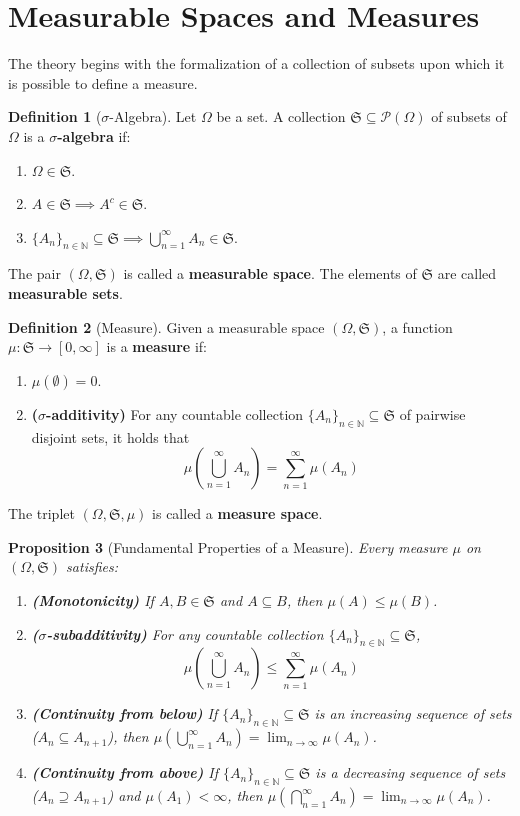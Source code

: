 \documentclass[12pt, openany]{book}
\theoremstyle{definition}
\newtheorem{definition}{Definition}[section]
\theoremstyle{plain}
\newtheorem{proposition}[definition]{Proposition}
\theoremstyle{remark}
\newcommand{\N}{\mathbb{N}}
\newcommand{\germS}{\mathfrak{S}} %
\begin{document}
\section*{Measurable Spaces and Measures}

The theory begins with the formalization of a collection of subsets upon which it is possible to define a measure.

\begin{definition}[$\sigma$-Algebra]
Let $\Omega$ be a set. A collection $\germS \subseteq \mathcal{P}(\Omega)$ of subsets of $\Omega$ is a \textbf{$\sigma$-algebra} if:
\begin{enumerate}
    \item $\Omega \in \germS$.
    \item $A \in \germS \implies A^c \in \germS$.
    \item $\{A_n\}_{n \in \N} \subseteq \germS \implies \bigcup_{n=1}^{\infty} A_n \in \germS$.
\end{enumerate}
The pair $(\Omega, \germS)$ is called a \textbf{measurable space}. The elements of $\germS$ are called \textbf{measurable sets}.
\end{definition}

\begin{definition}[Measure]
Given a measurable space $(\Omega, \germS)$, a function $\mu: \germS \to [0, \infty]$ is a \textbf{measure} if:
\begin{enumerate}
    \item $\mu(\emptyset) = 0$.
    \item \textbf{($\sigma$-additivity)} For any countable collection $\{A_n\}_{n \in \N} \subseteq \germS$ of pairwise disjoint sets, it holds that
    $$\mu\left(\bigcup_{n=1}^{\infty} A_n\right) = \sum_{n=1}^{\infty} \mu(A_n)$$
\end{enumerate}
The triplet $(\Omega, \germS, \mu)$ is called a \textbf{measure space}.
\end{definition}

\begin{proposition}[Fundamental Properties of a Measure]
Every measure $\mu$ on $(\Omega, \germS)$ satisfies:
\begin{enumerate}
    \item \textbf{(Monotonicity)} If $A, B \in \germS$ and $A \subseteq B$, then $\mu(A) \le \mu(B)$.
    \item \textbf{($\sigma$-subadditivity)} For any countable collection $\{A_n\}_{n \in \N} \subseteq \germS$,
    $$\mu\left(\bigcup_{n=1}^{\infty} A_n\right) \le \sum_{n=1}^{\infty} \mu(A_n)$$
    \item \textbf{(Continuity from below)} If $\{A_n\}_{n \in \N} \subseteq \germS$ is an increasing sequence of sets ($A_n \subseteq A_{n+1}$), then $\mu(\bigcup_{n=1}^{\infty} A_n) = \lim_{n \to \infty} \mu(A_n)$.
    \item \textbf{(Continuity from above)} If $\{A_n\}_{n \in \N} \subseteq \germS$ is a decreasing sequence of sets ($A_n \supseteq A_{n+1}$) and $\mu(A_1) < \infty$, then $\mu(\bigcap_{n=1}^{\infty} A_n) = \lim_{n \to \infty} \mu(A_n)$.
\end{enumerate}
\end{proposition}
\end{document}
